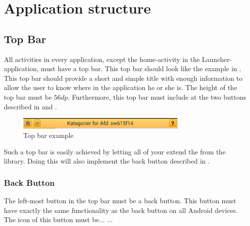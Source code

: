 
\chapter{Application structure}

\section{Top Bar}
All activities in every application, except the home-activity in the Launcher-application,  must have a top bar. This top bar should look like the example in . This top bar should provide a short and simple title with enough information to allow the user to know where in the application he or she is. The height of the top bar must be $56dp$. Furthermore, this top bar must include at the two buttons described in  and .


\begin{figure}[!htbp]
        \centering
        \includegraphics[width=0.75\textwidth]{pictures/application_structure/topbar}
        \caption{Top bar example}
        \label{fig:top_bar_example}
\end{figure}

\begin{note}
    Such a top bar is easily achieved by letting all of your  extend the  from the \gc library. Doing this will also implement the back button described in .
\end{note}

\subsection{Back Button}
\label{sec:back_button}
The left-most button in the top bar must be a back button. This button must have exactly the same functionality as the back button on all Android devices. The icon of this button must be... ...

